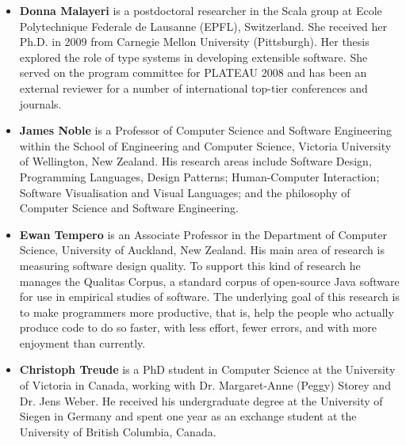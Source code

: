 \documentclass[authorpermission]{sigplanconf}
\begin{document}
\begin{itemize}



\item 
\textbf{Donna Malayeri} is a postdoctoral researcher in the Scala group at 
Ecole Polytechnique Federale de Lausanne (EPFL), Switzerland. She received her 
Ph.D. in 2009 from Carnegie Mellon University (Pittsburgh). Her thesis explored 
the role of type systems in developing extensible software. She served on the 
program committee for PLATEAU 2008 and has been an  external reviewer for a 
number of international top-tier conferences and journals.

\item \textbf{James Noble} is a Professor of Computer Science and
  Software Engineering within the School of Engineering and Computer
  Science, Victoria University of Wellington, New Zealand.  His
  research areas include Software Design, Programming Languages,
  Design Patterns; Human-Computer Interaction; Software Visualisation
  and Visual Languages; and the philosophy of Computer Science and
  Software Engineering. 

\item \textbf{Ewan Tempero} is an Associate Professor in the
  Department of Computer Science, University of Auckland, New
  Zealand. His main area of research is measuring software design
  quality. To support this kind of research he manages the Qualitas
  Corpus, a standard corpus of open-source Java software for use in
  empirical studies of software. The underlying goal of this research
  is to make programmers more productive, that is, help the people who
  actually produce code to do so faster, with less effort, fewer
  errors, and with more enjoyment than currently.

\item \textbf{Christoph Treude} is a PhD student in Computer Science at the University of Victoria in Canada, working with Dr. Margaret-Anne (Peggy) Storey and Dr. Jens Weber. He received his undergraduate degree at the University of Siegen in Germany and spent one year as an exchange student at the University of British Columbia, Canada.


\end{itemize}
\end{document}
